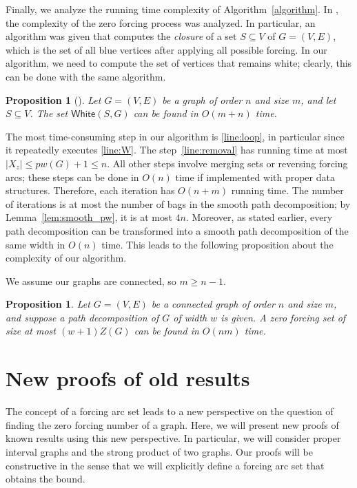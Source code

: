 \documentclass[12pt]{amsart}
\theoremstyle{plain}
\newtheorem{proposition}[theorem]{Proposition}
\theoremstyle{definition}
\renewcommand{\subset}{\subseteq}
\newcommand{\white}{\mathsf{White}}
\begin{document}

Finally, we analyze the running time complexity of Algorithm~\ref{algorithm}. 
In \cite{BrimkovFastHicks2019}, the complexity of the zero forcing process was analyzed. In particular, an algorithm was given that computes the  {\em closure} of a set $S\subset V$ of $G = (V, E)$, which is the set of all blue vertices after applying all possible forcing. In our algorithm, we need to compute the set of vertices that remains white; clearly, this can be done with the same algorithm. 
\begin{proposition}[\cite{BrimkovFastHicks2019}]
Let $G=(V, E)$ be a graph of order $n$ and size $m$, and let $S \subset V$. The set $\white(S,G)$ can be found in $O(m+n)$ time.
\end{proposition}

The most time-consuming step in our algorithm is \ref{line:loop}, in particular since it repeatedly executes \ref{line:W}. 
The step~\ref{line:removal} has running time at most $|X_z|\leq pw(G)+1\leq n$. All other steps involve merging sets or reversing forcing arcs; these steps can be done in $O(n)$ time if implemented with proper data structures. Therefore, each iteration has $O(n+m)$ running time. 
The number of iterations is at most the number of bags in the smooth path decomposition; by Lemma~\ref{lem:smooth_pw}, it is at most $4n$. Moreover, as stated earlier, every path decomposition can be transformed into a smooth path decomposition of the same width in $O(n)$ time. This leads to the following proposition about the complexity of our algorithm. 

We assume our graphs are connected, so $m\geq n-1$.

\begin{proposition}
   Let $G=(V, E)$ be a connected graph of order $n$ and size $m$, and suppose a path decomposition of $G$ of width $w$  is given. A zero forcing set of size at most $(w+1)Z(G)$ can be found in $O(nm)$ time.
\end{proposition}


\section{New proofs of old results}\label{sec:newproofs}


The concept of a forcing arc set leads to a new perspective on the question of finding the zero forcing number of a graph. Here, we will present new proofs of known results using this new perspective. 
In particular, we will consider proper interval graphs and the strong product of two graphs. Our proofs will be constructive in the sense that we will explicitly define a forcing arc set that obtains the bound. 
\end{document}
